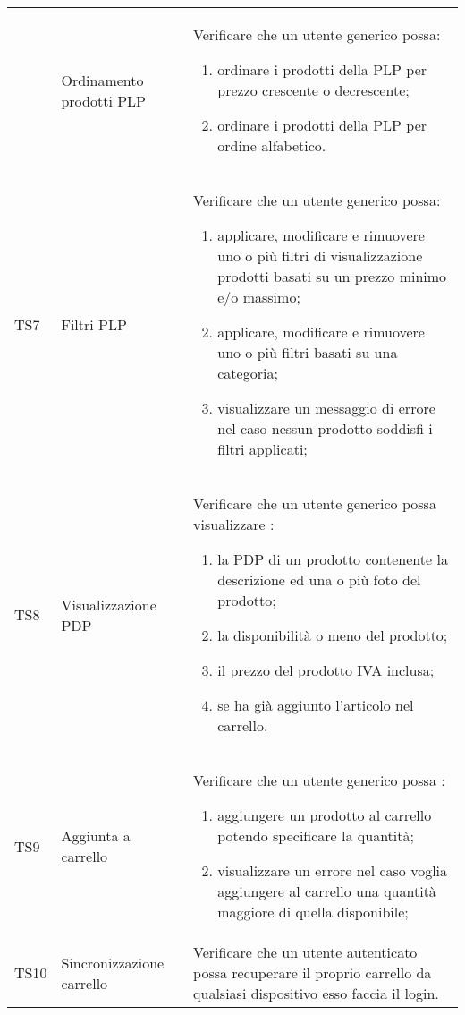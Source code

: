 \begin{center}
\begin{longtable}{|p{1cm}|p{6.85cm}|p{7cm}|}
\begin{longtable}{p{1cm}|p{6.85cm}|p{7cm}|}
	TS6 & Ordinamento prodotti PLP & Verificare che un utente generico possa: \begin{enumerate}
		\item  ordinare i prodotti della PLP per prezzo crescente o decrescente;
		\item  ordinare i prodotti della PLP per ordine alfabetico.
	\end{enumerate} \\

	TS7 & Filtri PLP & Verificare che un utente generico possa: \begin{enumerate}
		\item  applicare, modificare e rimuovere uno o più filtri di visualizzazione prodotti basati su un prezzo minimo e/o massimo;
		\item  applicare, modificare e rimuovere uno o più filtri basati su una categoria;
		\item  visualizzare un messaggio di errore nel caso nessun prodotto soddisfi i filtri applicati;
	\end{enumerate} \\

	TS8 & Visualizzazione PDP & Verificare che un utente generico possa visualizzare : \begin{enumerate}
		\item   la PDP di un prodotto contenente la descrizione ed una o più foto del prodotto;
		\item   la disponibilità o meno del prodotto;
		\item   il prezzo del prodotto IVA inclusa;
		\item   se ha già aggiunto l'articolo nel carrello.
	\end{enumerate} \\

	TS9 & Aggiunta a carrello & Verificare che un utente generico possa : \begin{enumerate}
		\item   aggiungere un prodotto al carrello potendo specificare la quantità;
		\item   visualizzare un errore nel caso voglia aggiungere al carrello una quantità maggiore di quella disponibile;
	
	\end{enumerate} \\

	TS10 & Sincronizzazione carrello & Verificare che un utente autenticato possa recuperare il proprio carrello da qualsiasi dispositivo esso faccia il login.\\





	\hline

	\end{longtable}
\end{center}

